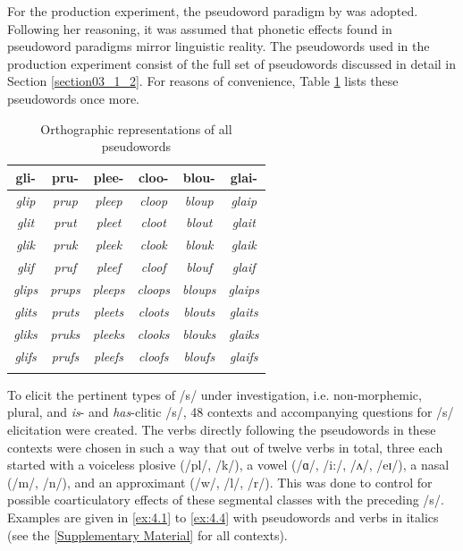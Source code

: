 For the production experiment, the pseudoword paradigm by \citet{Berko1958} was adopted. Following her reasoning, it was assumed that phonetic effects found in pseudoword paradigms mirror linguistic reality. The pseudowords used in the production experiment consist of the full set of pseudowords discussed in detail in Section \ref{section03_1_2}. For reasons of convenience, Table \ref{tab:4.1} lists these pseudowords once more.

\begin{table}\fontsize{10}{11}
\caption{Orthographic representations of all pseudowords}
\label{tab:4.1}
\centering
\begin{tabular}{cccccc} 
\lsptoprule
gli-           & pru-           & plee-           & cloo-           & blou-           & glai-            \\ 
\midrule
\textit{glip}  & \textit{prup}  & \textit{pleep}  & \textit{cloop}  & \textit{bloup}  & \textit{glaip}   \\
\textit{glit}  & \textit{prut}  & \textit{pleet}  & \textit{cloot}  & \textit{blout}  & \textit{glait}   \\
\textit{glik}  & \textit{pruk}  & \textit{pleek}  & \textit{clook}  & \textit{blouk}  & \textit{glaik}   \\
\textit{glif}  & \textit{pruf}  & \textit{pleef}  & \textit{cloof}  & \textit{blouf}  & \textit{glaif}   \\ 
\midrule
\textit{glips} & \textit{prups} & \textit{pleeps} & \textit{cloops} & \textit{bloups} & \textit{glaips}  \\
\textit{glits} & \textit{pruts} & \textit{pleets} & \textit{cloots} & \textit{blouts} & \textit{glaits}  \\
\textit{gliks} & \textit{pruks} & \textit{pleeks} & \textit{clooks} & \textit{blouks} & \textit{glaiks}  \\
\textit{glifs} & \textit{prufs} & \textit{pleefs} & \textit{cloofs} & \textit{bloufs} & \textit{glaifs}  \\
\lspbottomrule
\end{tabular}
\end{table}

To elicit the pertinent types of /s/ under investigation, i.e. non-morphemic, plural, and \textit{is}- and \textit{has}-clitic /s/, 48 contexts and accompanying questions for /s/ elicitation were created. The verbs directly following the pseudowords in these contexts were chosen in such a way that out of twelve verbs in total, three each started with a voiceless plosive (/pl/, /k/), a vowel (/ɑ/, /i:/, /ʌ/, /eɪ/), a nasal (/m/, /n/), and an approximant (/w/, /l/, /r/). This was done to control for possible coarticulatory effects of these segmental classes with the preceding /s/. Examples are given in \ref{ex:4.1} to \ref{ex:4.4} with pseudowords and verbs in italics (see the \ref{Supplementary Material} for all contexts).

